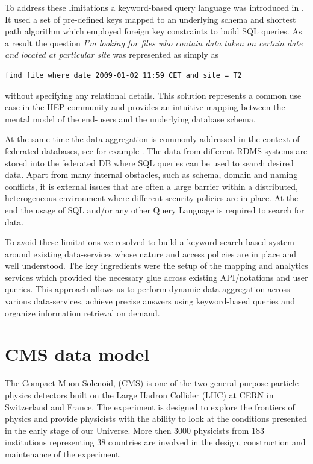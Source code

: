 \documentclass[1p,times]{elsarticle}
\begin{document}
To address these limitations a keyword-based query language was introduced in \cite{DBS-QL}.
It used a set of pre-defined keys mapped to an underlying schema and shortest path
algorithm which employed foreign key constraints to build SQL queries. As a result
the question
{\it I'm looking for files who contain data taken on certain date and located at
particular site} was represented as simply as \cite{DBS-QL}
\begin{verbatim}
find file where date 2009-01-02 11:59 CET and site = T2
\end{verbatim}
without specifying any relational details.
This solution represents a common use case in the HEP community and provides
an intuitive mapping between the mental model of the end-users and 
the underlying database schema.

At the same time the data aggregation is commonly addressed in the context of
federated databases, see for example \cite{FedDB}. The data from different 
RDMS systems are stored into the federated DB where SQL queries can be used to 
search desired data. Apart from many internal obstacles, such as
schema, domain and naming conflicts, it is external issues that are often
a large barrier within a distributed, heterogeneous environment where
different security policies are in place. At the end the usage of SQL and/or
any other Query Language is required to search for data.

To avoid these limitations we resolved to build a keyword-search based system around
existing data-services whose nature and access policies are in place and well understood.
The key ingredients were the setup of the mapping and analytics services which provided
the necessary glue across existing API/notations and user queries. This approach 
allows us to perform dynamic data aggregation across various data-services, achieve
precise answers using keyword-based queries
and organize information retrieval on demand.

\section{CMS data model\label{DataModel}}
The Compact Muon Solenoid, (CMS) \cite{CMS} 
is one of the two general purpose particle physics detectors built on 
the Large Hadron Collider (LHC) at CERN in Switzerland and France. 
The experiment is designed to explore the frontiers of physics and provide physicists
with the ability to look at the conditions presented in the early stage of our Universe.
More then 3000 physicists from 183 institutions representing 38 countries 
are involved in the design, construction and maintenance of the experiment.
\end{document}
